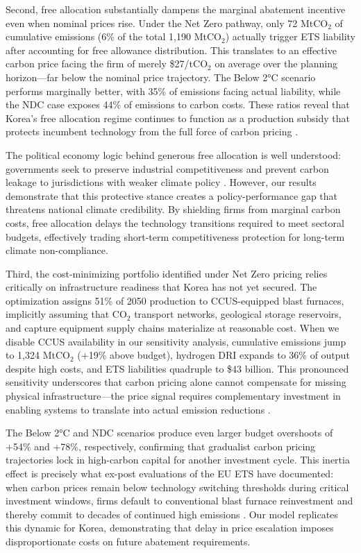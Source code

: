 \documentclass[preprint,1p,authoryear]{elsarticle}
\begin{document}
Second, free allocation substantially dampens the marginal abatement incentive even when nominal prices rise. Under the Net Zero pathway, only 72 MtCO$_2$ of cumulative emissions (6\% of the total 1,190 MtCO$_2$) actually trigger ETS liability after accounting for free allowance distribution. This translates to an effective carbon price facing the firm of merely \$27/tCO$_2$ on average over the planning horizon—far below the nominal price trajectory. The Below 2°C scenario performs marginally better, with 35\% of emissions facing actual liability, while the NDC case exposes 44\% of emissions to carbon costs. These ratios reveal that Korea's free allocation regime continues to function as a production subsidy that protects incumbent technology from the full force of carbon pricing \citep{sartor2012benchmark, demailly2018european}.

The political economy logic behind generous free allocation is well understood: governments seek to preserve industrial competitiveness and prevent carbon leakage to jurisdictions with weaker climate policy \citep{fowlie2016carbon, martin2016industry}. However, our results demonstrate that this protective stance creates a policy-performance gap that threatens national climate credibility. By shielding firms from marginal carbon costs, free allocation delays the technology transitions required to meet sectoral budgets, effectively trading short-term competitiveness protection for long-term climate non-compliance.

Third, the cost-minimizing portfolio identified under Net Zero pricing relies critically on infrastructure readiness that Korea has not yet secured. The optimization assigns 51\% of 2050 production to CCUS-equipped blast furnaces, implicitly assuming that CO$_2$ transport networks, geological storage reservoirs, and capture equipment supply chains materialize at reasonable cost. When we disable CCUS availability in our sensitivity analysis, cumulative emissions jump to 1,324 MtCO$_2$ (+19\% above budget), hydrogen DRI expands to 36\% of output despite high costs, and ETS liabilities quadruple to \$43 billion. This pronounced sensitivity underscores that carbon pricing alone cannot compensate for missing physical infrastructure—the price signal requires complementary investment in enabling systems to translate into actual emission reductions \citep{bataille2018role, Neuhoff2019CCfD}.

The Below 2°C and NDC scenarios produce even larger budget overshoots of +54\% and +78\%, respectively, confirming that gradualist carbon pricing trajectories lock in high-carbon capital for another investment cycle. This inertia effect is precisely what ex-post evaluations of the EU ETS have documented: when carbon prices remain below technology switching thresholds during critical investment windows, firms default to conventional blast furnace reinvestment and thereby commit to decades of continued high emissions \citep{Green2021, martin2016industry, calel2016innovation}. Our model replicates this dynamic for Korea, demonstrating that delay in price escalation imposes disproportionate costs on future abatement requirements.
\end{document}
